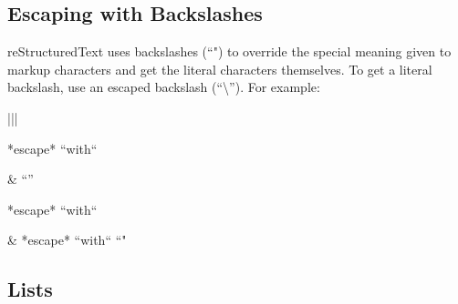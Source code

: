 \documentclass[letterpaper,10pt,english]{sphinxmanual}
\begin{document}
\subsection{Escaping with Backslashes}
\label{\detokenize{rst-cheatsheet/rst-cheatsheet:escaping-with-backslashes}}
reStructuredText uses backslashes (“") to override the special meaning given to markup characters and get
the literal characters themselves. To get a literal backslash, use an escaped backslash (“\textbackslash{}”). For example:


\begin{savenotes}\sphinxattablestart
\centering
\begin{tabular}[t]{|*{2}{|}}
\hline

\begin{sphinxVerbatimintable}[commandchars=\\\{\}]
*escape* ``with`` \PYGZdq{}\PYGZbs{}\PYGZdq{}
\end{sphinxVerbatimintable}
&
  “”
\\
\hline
\begin{sphinxVerbatimintable}[commandchars=\\\{\}]
\PYGZbs{}*escape* \PYGZbs{}``with`` \PYGZdq{}\PYGZbs{}\PYGZbs{}\PYGZdq{}
\end{sphinxVerbatimintable}
&
*escape* ``with`` “"
\\
\hline
\end{tabular}
\par
\sphinxattableend\end{savenotes}


\subsection{Lists}
\label{\detokenize{rst-cheatsheet/rst-cheatsheet:lists}}
\end{document}
